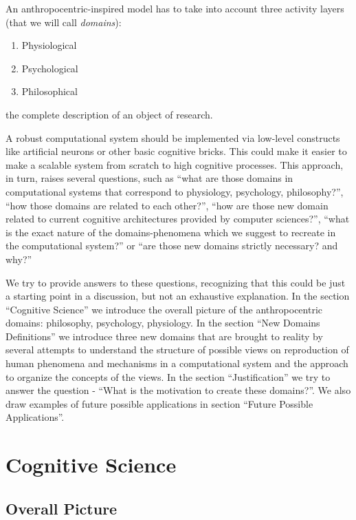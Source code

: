 An anthropocentric-inspired model has to take into account three
activity layers (that we will call \textit{domains}): 

\begin{enumerate}
	\item Physiological
	\item Psychological
	\item Philosophical
	
\end{enumerate}

the complete description of an object of research. 

A robust computational system should be implemented via low-level
constructs like artificial neurons or other basic cognitive bricks. 
This could make it easier to make a scalable system from scratch to high
cognitive processes. This approach, in turn, raises several questions,
such as ``what are those domains in computational systems that
correspond to physiology, psychology, philosophy?'', ``how those domains
are related to each other?'', ``how are those new domain related to
current cognitive architectures provided by computer sciences?'', ``what
is the exact nature of the domains-phenomena which we suggest to
recreate in the computational system?'' or ``are those new domains
strictly necessary? and why?''

We try to provide answers to these questions, recognizing that this
could be just a starting point in a discussion, but not an exhaustive
explanation. In the section ``Cognitive Science'' we introduce the
overall picture of the anthropocentric domains: philosophy, psychology,
physiology. In the section ``New Domains Definitions'' we introduce
three new domains that are brought to reality by several attempts to
understand the structure of possible views on reproduction of human
phenomena and mechanisms in a computational system and the approach to
organize the concepts of the views. In the section ``Justification'' we
try to answer the question - ``What is the motivation to create these
domains?''. We also draw examples of future possible applications in
section ``Future Possible Applications''.

\section{Cognitive Science}\label{cognitive-science}

\subsection{Overall Picture}\label{overall-picture}

